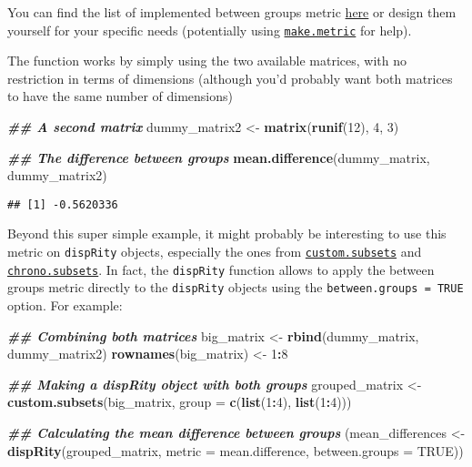 \documentclass[
]{book}
\newenvironment{Shaded}{\begin{snugshade}}{\end{snugshade}}
\newcommand{\AttributeTok}[1]{\textcolor[rgb]{0.13,0.29,0.53}{#1}}
\newcommand{\ConstantTok}[1]{\textcolor[rgb]{0.56,0.35,0.01}{#1}}
\newcommand{\DecValTok}[1]{\textcolor[rgb]{0.00,0.00,0.81}{#1}}
\newcommand{\DocumentationTok}[1]{\textcolor[rgb]{0.56,0.35,0.01}{\textbf{\textit{#1}}}}
\newcommand{\FunctionTok}[1]{\textcolor[rgb]{0.13,0.29,0.53}{\textbf{#1}}}
\newcommand{\NormalTok}[1]{#1}
\newcommand{\OtherTok}[1]{\textcolor[rgb]{0.56,0.35,0.01}{#1}}
\newcommand{\SpecialCharTok}[1]{\textcolor[rgb]{0.81,0.36,0.00}{\textbf{#1}}}
\begin{document}
You can find the list of implemented between groups metric \protect\hyperlink{betweengroupmetricslist}{here} or design them yourself for your specific needs (potentially using \protect\hyperlink{makemetric}{\texttt{make.metric}} for help).

The function works by simply using the two available matrices, with no restriction in terms of dimensions (although you'd probably want both matrices to have the same number of dimensions)

\begin{Shaded}
\begin{Highlighting}[]
\DocumentationTok{\#\# A second matrix}
\NormalTok{dummy\_matrix2 }\OtherTok{\textless{}{-}} \FunctionTok{matrix}\NormalTok{(}\FunctionTok{runif}\NormalTok{(}\DecValTok{12}\NormalTok{), }\DecValTok{4}\NormalTok{, }\DecValTok{3}\NormalTok{)}

\DocumentationTok{\#\# The difference between groups}
\FunctionTok{mean.difference}\NormalTok{(dummy\_matrix, dummy\_matrix2)}
\end{Highlighting}
\end{Shaded}

\begin{verbatim}
## [1] -0.5620336
\end{verbatim}

Beyond this super simple example, it might probably be interesting to use this metric on \texttt{dispRity} objects, especially the ones from \protect\hyperlink{custom-subsets}{\texttt{custom.subsets}} and \protect\hyperlink{chrono-subsets}{\texttt{chrono.subsets}}.
In fact, the \texttt{dispRity} function allows to apply the between groups metric directly to the \texttt{dispRity} objects using the \texttt{between.groups\ =\ TRUE} option.
For example:

\begin{Shaded}
\begin{Highlighting}[]
\DocumentationTok{\#\# Combining both matrices}
\NormalTok{big\_matrix }\OtherTok{\textless{}{-}} \FunctionTok{rbind}\NormalTok{(dummy\_matrix, dummy\_matrix2)}
\FunctionTok{rownames}\NormalTok{(big\_matrix) }\OtherTok{\textless{}{-}} \DecValTok{1}\SpecialCharTok{:}\DecValTok{8}

\DocumentationTok{\#\# Making a dispRity object with both groups}
\NormalTok{grouped\_matrix }\OtherTok{\textless{}{-}} \FunctionTok{custom.subsets}\NormalTok{(big\_matrix,}
                                 \AttributeTok{group =} \FunctionTok{c}\NormalTok{(}\FunctionTok{list}\NormalTok{(}\DecValTok{1}\SpecialCharTok{:}\DecValTok{4}\NormalTok{), }\FunctionTok{list}\NormalTok{(}\DecValTok{1}\SpecialCharTok{:}\DecValTok{4}\NormalTok{)))}

\DocumentationTok{\#\# Calculating the mean difference between groups}
\NormalTok{(mean\_differences }\OtherTok{\textless{}{-}} \FunctionTok{dispRity}\NormalTok{(grouped\_matrix,}
                              \AttributeTok{metric =}\NormalTok{ mean.difference,}
                              \AttributeTok{between.groups =} \ConstantTok{TRUE}\NormalTok{))}
\end{Highlighting}
\end{Shaded}
\end{document}

